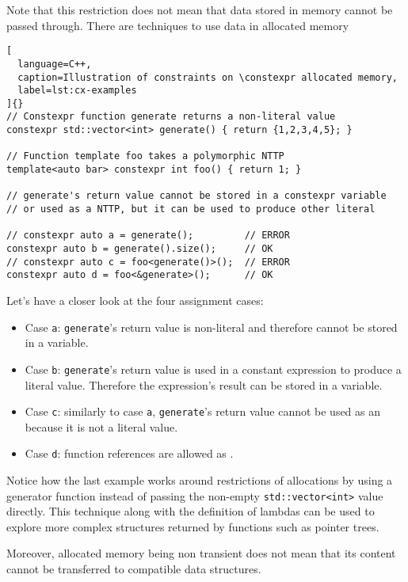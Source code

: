 \documentclass[../main]{subfiles}
\begin{document}
Note that this restriction does not mean that data stored in \constexpr memory
cannot be passed through. There are techniques to use data in \constexpr
allocated memory

\begin{lstlisting}[
  language=C++,
  caption=Illustration of constraints on \constexpr allocated memory,
  label=lst:cx-examples
]{}
// Constexpr function generate returns a non-literal value
constexpr std::vector<int> generate() { return {1,2,3,4,5}; }

// Function template foo takes a polymorphic NTTP
template<auto bar> constexpr int foo() { return 1; }

// generate's return value cannot be stored in a constexpr variable
// or used as a NTTP, but it can be used to produce other literal

// constexpr auto a = generate();         // ERROR
constexpr auto b = generate().size();     // OK
// constexpr auto c = foo<generate()>();  // ERROR
constexpr auto d = foo<&generate>();      // OK
\end{lstlisting}

Let's have a closer look at the four assignment cases:

\begin{itemize}
\item Case \lstinline{a}: \lstinline{generate}'s return value is non-literal
      and therefore cannot be stored in a \constexpr variable.
\item Case \lstinline{b}: \lstinline{generate}'s return value is used in a
      constant expression to produce a literal value.
      Therefore the expression's result can be stored in a \constexpr variable.
\item Case \lstinline{c}: similarly to case \lstinline{a},
      \lstinline{generate}'s return value cannot be used as an \nttp because it
      is not a literal value.
\item Case \lstinline{d}: function references are allowed as \nttps.
\end{itemize}

Notice how the last example works around restrictions of \constexpr allocations
by using a generator function instead of passing the non-empty
\lstinline{std::vector<int>} value directly. This technique along with the
definition of lambdas can be used to explore more complex structures returned by
\constexpr functions such as pointer trees.

Moreover, \constexpr allocated memory being non transient does not mean that its
content cannot be transferred to \nttp compatible data structures.
\end{document}
